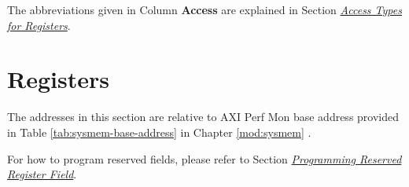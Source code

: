 \documentclass[main\_\_EN.tex]{subfiles}
\begin{document}
The abbreviations given in Column \textbf{Access} are explained in Section \hyperref[glossary-access-types]{\textit{Access Types for Registers}}.






\newpage
\section{Registers}

The addresses in this section are relative to AXI Perf Mon base address provided in Table \ref{tab:sysmem-base-address} in Chapter \ref{mod:sysmem} \textit{}.

For how to program reserved fields, please refer to Section \hyperref[programming-reserved-field]{\textit{Programming Reserved Register Field}}.



\end{document}
